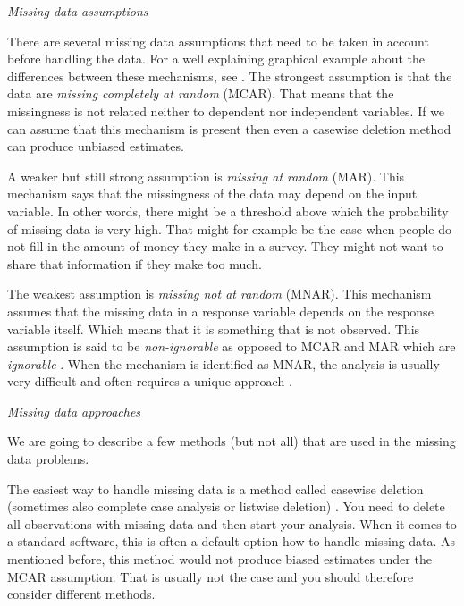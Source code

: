 \documentclass[hidelinks,a4paper]{article}
\renewcommand{\subsection}[1]{%
\bigskip
\begin{center}
\begin{large}
\normalfont\itshape #1
\end{large}
\end{center}}
\begin{document}
\begin{multicols}{2}
\subsection{Missing data assumptions}
There are several missing data assumptions \cite{allison2001missing,Donders06} that need to be taken in account before handling the data. For a well explaining graphical example about the differences between these mechanisms, see \cite{Nakagawa2008}. The strongest assumption is that the data are \emph{missing completely at random} (MCAR). That means that the missingness is not related neither to dependent nor independent variables. If we can assume that this mechanism is present then even a casewise deletion method can produce unbiased estimates.

A weaker but still strong assumption is \emph{missing at random} (MAR). This mechanism says that the missingness of the data may depend on the input variable. In other words, there might be a threshold above which the probability of missing data is very high. That might for example be the case when people do not fill in the amount of money they make in a survey. They might not want to share that information if they make too much.

The weakest assumption is \emph{missing not at random} (MNAR). This mechanism assumes that the missing data in a response variable depends on the response variable itself. Which means that it is something that is not observed. This assumption is said to be \emph{non-ignorable} as opposed to MCAR and MAR which are \emph{ignorable} \cite{allison2001missing}. When the mechanism is identified as MNAR, the analysis is usually very difficult and often requires a unique approach \cite{Buuren2011}.

\subsection{Missing data approaches}
We are going to describe a few methods (but not all) that are used in the missing data problems.

The easiest way to handle missing data is a method called casewise deletion (sometimes also complete case analysis or listwise deletion) \cite{allison2001missing,Donders06}. You need to delete all observations with missing data and then start your analysis. When it comes to a standard software, this is often a default option how to handle missing data. As mentioned before, this method would not produce biased estimates under the MCAR assumption. That is usually not the case and you should therefore consider different methods.


\end{multicols}
\end{document}
